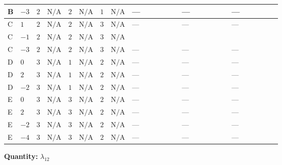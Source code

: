 \documentclass[8pt]{article}
\begin{document}
\begin{landscape}
\begin{longtable}{@{}llcccccc >{\raggedright\arraybackslash}p{0.21\linewidth} >{\raggedright\arraybackslash}p{0.21\linewidth} >{\raggedright\arraybackslash}p{0.21\linewidth}@{}}
\midrule
B & $-3$ & $2$ & $\text{N/A}$ & $2$ & $\text{N/A}$ & $1$ & $\text{N/A}$ & --- & --- & --- \\
\midrule
C & $1$ & $2$ & $\text{N/A}$ & $2$ & $\text{N/A}$ & $3$ & $\text{N/A}$ & --- & --- & --- \\
\midrule
C & $-1$ & $2$ & $\text{N/A}$ & $2$ & $\text{N/A}$ & $3$ & $\text{N/A}$ & \scriptsize\adjustbox{max width=\linewidth}{$\begin{gathered} +{\lambda_1} (4 {\lambda_{H H^\dagger S_1^\dagger S_2^\dagger}^{\rm Cross}}-2 {\lambda_{X_{17}}^{(1)}})\end{gathered}$} & \scriptsize\adjustbox{max width=\linewidth}{$\begin{gathered} +{\lambda_{HS_1}^{(1)}} (4 {\lambda_{H H^\dagger S_1^\dagger S_2^\dagger}^{\rm Cross}}+6 {\lambda_{11}})\end{gathered}$} & \scriptsize\adjustbox{max width=\linewidth}{$\begin{gathered} +{\lambda_{HS_1}^{(A)}} \left(2 {\lambda_{H H^\dagger S_1^\dagger S_2^\dagger}^{\rm Cross}}+\frac{{\lambda_{11}}}{2}+{\lambda_{X_{17}}^{(1)}}\right)\end{gathered}$} \\
\midrule
C & $-3$ & $2$ & $\text{N/A}$ & $2$ & $\text{N/A}$ & $3$ & $\text{N/A}$ & --- & --- & --- \\
\midrule
D & $0$ & $3$ & $\text{N/A}$ & $1$ & $\text{N/A}$ & $2$ & $\text{N/A}$ & --- & --- & --- \\
\midrule
D & $2$ & $3$ & $\text{N/A}$ & $1$ & $\text{N/A}$ & $2$ & $\text{N/A}$ & --- & --- & --- \\
\midrule
D & $-2$ & $3$ & $\text{N/A}$ & $1$ & $\text{N/A}$ & $2$ & $\text{N/A}$ & --- & --- & --- \\
\midrule
E & $0$ & $3$ & $\text{N/A}$ & $3$ & $\text{N/A}$ & $2$ & $\text{N/A}$ & --- & --- & --- \\
\midrule
E & $2$ & $3$ & $\text{N/A}$ & $3$ & $\text{N/A}$ & $2$ & $\text{N/A}$ & --- & --- & --- \\
\midrule
E & $-2$ & $3$ & $\text{N/A}$ & $3$ & $\text{N/A}$ & $2$ & $\text{N/A}$ & --- & --- & --- \\
\midrule
E & $-4$ & $3$ & $\text{N/A}$ & $3$ & $\text{N/A}$ & $2$ & $\text{N/A}$ & --- & --- & --- \\
\midrule
\bottomrule
\end{longtable}
\clearpage
\noindent\textbf{Quantity: }$\lambda_{12}$\par\smallskip

\end{landscape}
\end{document}

